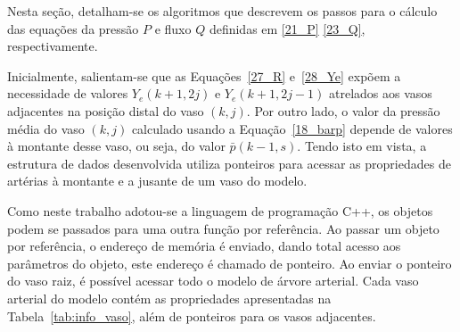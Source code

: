 Nesta seção, detalham-se os algoritmos que descrevem os passos para o cálculo das equações da pressão $P$ e fluxo $Q$ definidas em \eqref{21_P} \eqref{23_Q}, respectivamente.

Inicialmente, salientam-se que as Equações~\eqref{27_R} e~\eqref{28_Ye} expõem a necessidade de valores $Y_e(k+1,2j)$ e $Y_e(k+1,2j-1)$ atrelados aos vasos adjacentes na posição distal do vaso $(k,j)$. Por outro lado, o valor da pressão média do vaso $(k,j)$ calculado usando a Equação~\eqref{18_barp} depende de valores  à montante desse vaso, ou seja, do valor $\bar{p}(k-1,s)$. Tendo isto em vista, a estrutura de dados desenvolvida utiliza ponteiros para acessar as propriedades de artérias à montante e a jusante de um vaso do modelo.

Como neste trabalho adotou-se a linguagem de programação C++, os objetos podem se passados para uma outra função por referência. Ao passar um objeto por referência, o endereço de memória é enviado, dando total acesso aos parâmetros do objeto, este endereço é chamado de ponteiro. Ao enviar o ponteiro do vaso raiz, é possível acessar todo o modelo de árvore arterial. Cada vaso arterial do modelo contém as propriedades apresentadas na Tabela~\ref{tab:info_vaso}, além de ponteiros para os vasos adjacentes. 

